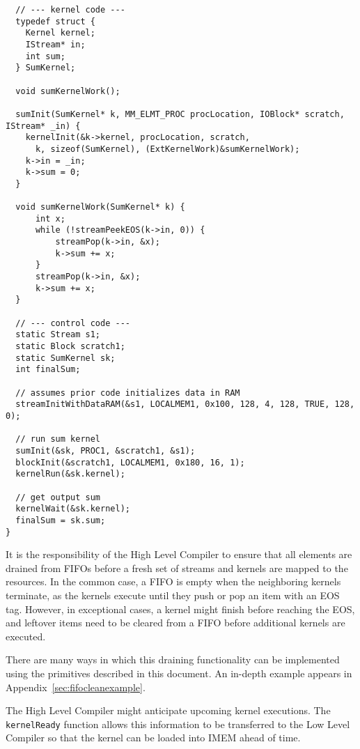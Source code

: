 {\small
\begin{verbatim}
  // --- kernel code ---
  typedef struct {
    Kernel kernel;
    IStream* in;
    int sum;
  } SumKernel;

  void sumKernelWork();
  
  sumInit(SumKernel* k, MM_ELMT_PROC procLocation, IOBlock* scratch, IStream* _in) {
    kernelInit(&k->kernel, procLocation, scratch,
      k, sizeof(SumKernel), (ExtKernelWork)&sumKernelWork); 
    k->in = _in;
    k->sum = 0;
  }

  void sumKernelWork(SumKernel* k) {
      int x;
      while (!streamPeekEOS(k->in, 0)) {
          streamPop(k->in, &x);
          k->sum += x;
      }
      streamPop(k->in, &x);
      k->sum += x;
  }

  // --- control code ---
  static Stream s1;
  static Block scratch1;
  static SumKernel sk;
  int finalSum;

  // assumes prior code initializes data in RAM
  streamInitWithDataRAM(&s1, LOCALMEM1, 0x100, 128, 4, 128, TRUE, 128, 0);

  // run sum kernel
  sumInit(&sk, PROC1, &scratch1, &s1);
  blockInit(&scratch1, LOCALMEM1, 0x180, 16, 1);
  kernelRun(&sk.kernel);

  // get output sum
  kernelWait(&sk.kernel);
  finalSum = sk.sum; 
}\end{verbatim}}

\label{sec:fifoclean}

It is the responsibility of the High Level Compiler to ensure that all
elements are drained from FIFOs before a fresh set of streams and
kernels are mapped to the resources.  In the common case, a FIFO is
empty when the neighboring kernels terminate, as the kernels execute
until they push or pop an item with an EOS tag.  However, in
exceptional cases, a kernel might finish before reaching the EOS, and
leftover items need to be cleared from a FIFO before additional
kernels are executed.

There are many ways in which this draining functionality can be
implemented using the primitives described in this document.  An
in-depth example appears in Appendix~\ref{sec:fifocleanexample}.


The High Level Compiler might anticipate upcoming kernel
executions. The {\tt kernelReady} function allows this information to
be transferred to the Low Level Compiler so that the kernel can be
loaded into IMEM ahead of time.

